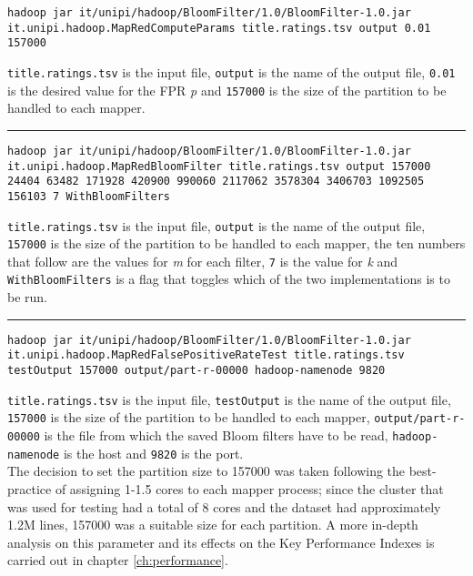\begin{lstlisting}[basicstyle=\ttfamily\footnotesize, breaklines=true, backgroundcolor = \color{lightgray}]
hadoop jar it/unipi/hadoop/BloomFilter/1.0/BloomFilter-1.0.jar it.unipi.hadoop.MapRedComputeParams title.ratings.tsv output 0.01 157000
\end{lstlisting}
\hfill \break
\texttt{title.ratings.tsv} is the input file, \texttt{output} is the name of the output file, \texttt{0.01} is the desired value for the FPR \textit{p} and \texttt{157000} is the size of the partition to be handled to each mapper.
\vspace{5pt}
\hrule
\vspace{6pt}
\begin{lstlisting}[basicstyle=\ttfamily\footnotesize, breaklines=true, backgroundcolor = \color{lightgray}]
hadoop jar it/unipi/hadoop/BloomFilter/1.0/BloomFilter-1.0.jar it.unipi.hadoop.MapRedBloomFilter title.ratings.tsv output 157000 24404 63482 171928 420900 990060 2117062 3578304 3406703 1092505 156103 7 WithBloomFilters
\end{lstlisting}
\hfill \break
\texttt{title.ratings.tsv} is the input file, \texttt{output} is the name of the output file, \texttt{157000} is the size of the partition to be handled to each mapper, the ten numbers that follow are the values for \textit{m} for each filter, \texttt{7} is the value for \textit{k} and \texttt{WithBloomFilters} is a flag that toggles which of the two implementations is to be run.
\vspace{5pt}
\hrule
\vspace{6pt}
\begin{lstlisting}[basicstyle=\ttfamily\footnotesize, breaklines=true, backgroundcolor = \color{lightgray}]
hadoop jar it/unipi/hadoop/BloomFilter/1.0/BloomFilter-1.0.jar it.unipi.hadoop.MapRedFalsePositiveRateTest title.ratings.tsv testOutput 157000 output/part-r-00000 hadoop-namenode 9820
\end{lstlisting}
\hfill \break
\texttt{title.ratings.tsv} is the input file, \texttt{testOutput} is the name of the output file, \texttt{157000} is the size of the partition to be handled to each mapper, \texttt{output/part-r-00000} is the file from which the saved Bloom filters have to be read, \texttt{hadoop-namenode} is the host and \texttt{9820} is the port.\\
\hfill \break
The decision to set the partition size to 157000 was taken following the best-practice of assigning 1-1.5 cores to each mapper process; since the cluster that was used for testing had a total of 8 cores and the dataset had approximately 1.2M lines, 157000 was a suitable size for each partition. A more in-depth analysis on this parameter and its effects on the Key Performance Indexes is carried out in chapter \ref{ch:performance}.